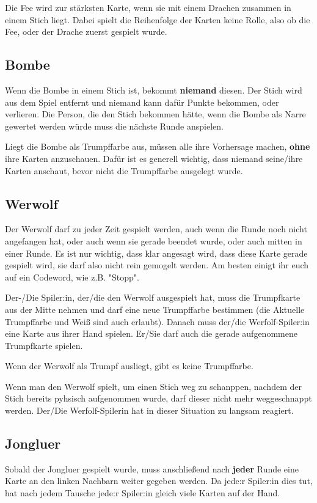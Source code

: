 \documentclass[3pt]{article}
\begin{document}
Die Fee wird zur stärksten Karte, wenn sie mit einem Drachen zusammen in einem Stich liegt.
Dabei spielt die Reihenfolge der Karten keine Rolle, also ob die Fee, oder der Drache zuerst gespielt wurde.

\subsection{Bombe}
Wenn die Bombe in einem Stich ist, bekommt \textbf{niemand} diesen.
Der Stich wird aus dem Spiel entfernt und niemand kann dafür Punkte bekommen, oder verlieren.
Die Person, die den Stich bekommen hätte, wenn die Bombe als Narre gewertet werden würde muss die nächste Runde anspielen. %

Liegt die Bombe als Trumpffarbe aus, müssen alle ihre Vorhersage machen, \textbf{ohne} ihre Karten anzuschauen.
Dafür ist es generell wichtig, dass niemand seine/ihre Karten anschaut, bevor nicht die Trumpffarbe ausgelegt wurde.

\subsection{Werwolf}
Der Werwolf darf zu jeder Zeit gespielt werden, auch wenn die Runde noch nicht angefangen hat, oder auch wenn sie gerade beendet wurde, oder auch mitten in einer Runde.
Es ist nur wichtig, dass klar angesagt wird, dass diese Karte gerade gespielt wird, sie darf also nicht rein gemogelt werden.
Am besten einigt ihr euch auf ein Codeword, wie z.B. "Stopp".

Der-/Die Spiler:in, der/die den Werwolf ausgespielt hat, muss die Trumpfkarte aus der Mitte nehmen und darf eine neue Trumpffarbe bestimmen (die Aktuelle Trumpffarbe und Weiß sind auch erlaubt).
Danach muss der/die Werfolf-Spiler:in eine Karte aus ihrer Hand spielen.
Er/Sie darf auch die gerade aufgenommene Trumpfkarte spielen.

Wenn der Werwolf als Trumpf ausliegt, gibt es keine Trumpffarbe.

Wenn man den Werwolf spielt, um einen Stich weg zu schanppen, nachdem der Stich bereits pyhsisch aufgenommen wurde, darf dieser nicht mehr weggeschnappt werden.
Der/Die Werfolf-Spilerin hat in dieser Situation zu langsam reagiert.

\subsection{Jongluer}
Sobald der Jongluer gespielt wurde, muss anschließend nach \textbf{jeder} Runde eine Karte an den linken Nachbarn weiter gegeben werden.
Da jede:r Spiler:in dies tut, hat nach jedem Tausche jede:r Spiler:in gleich viele Karten auf der Hand.
\end{document}
